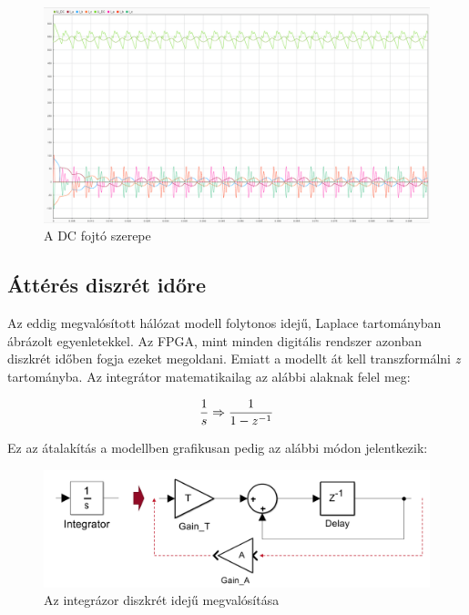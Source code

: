 \begin{figure}[H!]
	\centering
	\includegraphics[width = \textwidth]{figures/choke_vs_nochoke_11A.png}
	\caption{A DC fojtó szerepe} 
	\label{fig:chokenochoke}
\end{figure}



\subsection{Áttérés diszrét időre}

Az eddig megvalósított hálózat modell folytonos idejű, Laplace tartományban ábrázolt egyenletekkel. Az FPGA, mint minden digitális rendszer azonban diszkrét időben fogja ezeket megoldani. Emiatt a modellt át kell transzformálni \emph{z} tartományba. Az integrátor matematikailag az alábbi alaknak felel meg:

\begin{equation}
\centering
\frac{1}{s} \Rightarrow \frac{1}{1-z^{-1}}
\end{equation}

Ez az átalakítás a modellben grafikusan pedig az alábbi módon jelentkezik:

\begin{figure}[h]
	\centering
	\includegraphics[width = \textwidth]{figures/integrator.png}
	\caption{Az integrázor diszkrét idejű megvalósítása} 
	\label{fig:integrator}
\end{figure}


